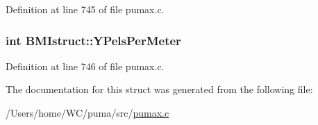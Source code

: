 \-Definition at line 745 of file pumax.\-c.

\hypertarget{struct_b_m_istruct_a0eae4b963d52b8a8eb15fc6275f8b481}{
\subsubsection[{\-Y\-Pels\-Per\-Meter}]{\setlength{\rightskip}{0pt plus 5cm}int {\bf \-B\-M\-Istruct\-::\-Y\-Pels\-Per\-Meter}}}
\label{struct_b_m_istruct_a0eae4b963d52b8a8eb15fc6275f8b481}


\-Definition at line 746 of file pumax.\-c.



\-The documentation for this struct was generated from the following file\-:\begin{DoxyCompactItemize}
\item 
/\-Users/home/\-W\-C/puma/src/\hyperlink{pumax_8c}{pumax.\-c}\end{DoxyCompactItemize}
